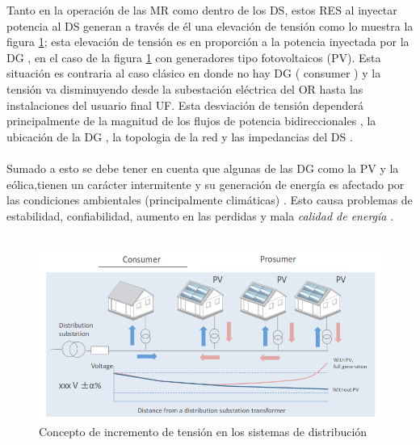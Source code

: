 \documentclass[12pt, letterpaper]{report}
\begin{document}
Tanto en la operación de las  \ac{MR} como dentro de los \ac{DS}, estos \ac{RES}  al inyectar potencia  al \ac{DS}  generan a través de  él  una elevación de tensión \cite{GSGF2015} como lo muestra la figura \ref{fig:ejemplo_control_de_tension}; esta elevación de tensión es en proporción a la potencia inyectada por la \ac{DG} , en el caso  de la figura \ref{fig:ejemplo_control_de_tension} con generadores tipo fotovoltaicos  (\ac{PV}). Esta situación es contraria al caso clásico en donde no hay \ac{DG} ( consumer ) y la tensión va disminuyendo desde la subestación eléctrica del OR hasta las instalaciones del usuario final \ac{UF}. Esta desviación de tensión  dependerá principalmente de la magnitud de los flujos de potencia bidireccionales \cite{Koutsoukis2017}, la ubicación de la \ac{DG} \cite{Othman2016a}, la topologia de la red y las impedancias del \ac{DS} .\\\\
Sumado a esto se debe tener en cuenta que algunas de las \ac{DG} como la \ac{PV} y la eólica,tienen un carácter  intermitente y su generación de energía  es afectado por  las condiciones ambientales (principalmente climáticas) \cite{Mahmud2016}. Esto causa problemas de estabilidad, confiabilidad, aumento en las perdidas y mala \textit{calidad de energía} \cite{Karanki2014}\cite{DinakaraPrasadReddy2017}.\\\\

 \begin{figure}[H]
 	\centering
 	\includegraphics[width=0.7\linewidth]{imagenes/ejemplo_control_de_tension}
 	\caption{Concepto de incremento de tensión en los sistemas de distribución \cite{GSGF2015} }
 	\label{fig:ejemplo_control_de_tension}
 \end{figure}
\end{document}
